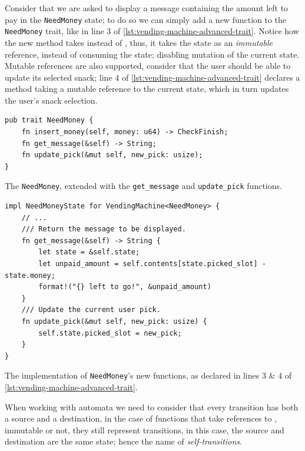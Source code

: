 Consider that we are asked to display a message containing the amount left to pay in the \texttt{NeedMoney} state;
to do so we can simply add a new function to the \texttt{NeedMoney} trait, like in line 3 of \autoref{lst:vending-machine-advanced-trait}.
Notice how the new method takes  instead of , thus,
it takes the state as an \emph{immutable} reference, instead of consuming the state;
disabling mutation of the current state.
Mutable references are also supported,
consider that the user should be able to update its selected snack;
line 4 of \autoref{lst:vending-machine-advanced-trait} declares a method taking a mutable reference to the current state,
which in turn updates the user's snack selection.

\begin{listing}
    \begin{verbatim}
pub trait NeedMoney {
    fn insert_money(self, money: u64) -> CheckFinish;
    fn get_message(&self) -> String;
    fn update_pick(&mut self, new_pick: usize);
}
    \end{verbatim}
    \caption{The \texttt{NeedMoney}, extended with the \texttt{get\_message} and \texttt{update\_pick} functions.}
    \label{lst:vending-machine-advanced-trait}
\end{listing}

\begin{listing}
    \begin{verbatim}
impl NeedMoneyState for VendingMachine<NeedMoney> {
    // ...
    /// Return the message to be displayed.
    fn get_message(&self) -> String {
        let state = &self.state;
        let unpaid_amount = self.contents[state.picked_slot] - state.money;
        format!("{} left to go!", &unpaid_amount)
    }
    /// Update the current user pick.
    fn update_pick(&mut self, new_pick: usize) {
        self.state.picked_slot = new_pick;
    }
}
    \end{verbatim}
    \caption{The implementation of \texttt{NeedMoney}'s new functions, as declared in lines 3 \& 4 of \autoref{lst:vending-machine-advanced-trait}.}
    \label{lst:vending-machine-advanced-trait-impl}
\end{listing}

When working with automata we need to consider that every transition has both a source and a destination,
in the case of functions that take references to , immutable or not,
they still represent transitions, in this case, the source and destination are the same state;
hence the name of \emph{self-transitions}.

